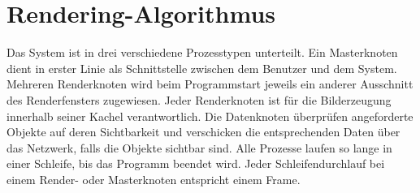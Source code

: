 \section{Rendering-Algorithmus}
\label{sec:impl:renderalgo}

Das System ist in drei verschiedene Prozesstypen unterteilt. Ein Masterknoten dient in erster Linie als Schnittstelle zwischen dem Benutzer und dem System. Mehreren Renderknoten wird beim Programmstart jeweils ein anderer Ausschnitt des Renderfensters zugewiesen. Jeder Renderknoten ist für die Bilderzeugung innerhalb seiner Kachel verantwortlich. Die Datenknoten überprüfen angeforderte Objekte auf deren Sichtbarkeit und verschicken die entsprechenden Daten über das Netzwerk, falls die Objekte sichtbar sind. Alle Prozesse laufen so lange in einer Schleife, bis das Programm beendet wird. Jeder Schleifendurchlauf bei einem Render- oder Masterknoten entspricht einem Frame.\\
